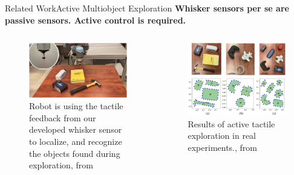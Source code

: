 \documentclass[AIRbeamer
,optEnglish
,optBiber
,optBibstyleAlphabetic
,optBeamerClassicFormat%
]{AIRlatex}
\begin{document}
    \begin{frame}[c]{Related Work}{Active Multiobject Exploration}
        \textbf{Whisker sensors per se are passive sensors. \to Active control is required.}\\
        \begin{columns}[T,onlytextwidth]
            \begin{column}[T]{0.48\textwidth}
                \begin{figure}[H]
                    \centering
                    \includegraphics[width=\textwidth]{figures/related-works-2-prototype}
                    \caption{Robot is using the tactile feedback from our developed whisker sensor to localize, and recognize the objects found during exploration, from~\cite{Xiao_2022}}
                \end{figure}
            \end{column}
            \begin{column}[T]{0.48\textwidth}
                \begin{figure}[H]
                    \centering
                    \includegraphics[width=\textwidth]{figures/related-works-2-results}
                    \caption{Results of active tactile exploration in real experiments., from~\cite{Xiao_2022}}
                \end{figure}
            \end{column}
        \end{columns}
    \end{frame}
\end{document}
